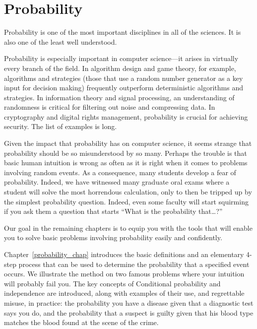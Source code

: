 \part{Probability}
\label{part:probability}

\partintro
{}

Probability is one of the most important disciplines in all of the
sciences.  It is also one of the least well understood.

Probability is especially important in computer science---it arises in
virtually every branch of the field.  In algorithm design and game
theory, for example,  algorithms and strategies
(those that use a random number generator as a key input for decision
making) frequently outperform deterministic algorithms and
strategies.  In information theory and signal processing, an
understanding of randomness is critical for filtering out noise and
compressing data.  In cryptography and digital rights management,
probability is crucial for achieving security.  The list of examples
is long.

Given the impact that probability has on computer science, it seems
strange that probability should be so misunderstood by so many.
Perhaps the trouble is that basic human intuition is wrong as often as
it is right when it comes to problems involving random events.  As a
consequence, many students develop a fear of probability.  Indeed, we
have witnessed many graduate oral exams where a student will solve the
most horrendous calculation, only to then be tripped up by the simplest
probability question.  Indeed, even some faculty will start squirming
if you ask them a question that starts ``What is the probability
that\dots?''

Our goal in the remaining chapters is to equip you with the tools that
will enable you to solve basic problems involving probability easily
and confidently.

Chapter~\ref{probability_chap} introduces the basic definitions and an
elementary 4-step process that can be used to determine the
probability that a specified event occurs.  We illustrate the method
on two famous problems where your intuition will probably fail you.
The key concepts of Conditional probability and independence are
introduced, along with examples of their use, and regrettable misuse,
in practice: the probability you have a disease given that a
diagnostic test says you do, and the probability that a suspect is
guilty given that his blood type matches the blood found at the scene
of the crime.

